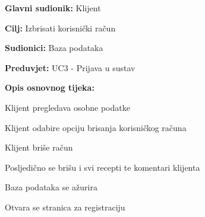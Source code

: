 					\noindent {}
					\begin{packed_item}
	
						\item \textbf{Glavni sudionik: } Klijent
						\item  \textbf{Cilj:} Izbrisati korisnički račun
						\item  \textbf{Sudionici:} Baza podataka
						\item  \textbf{Preduvjet:} UC3 - Prijava u sustav
						\item  \textbf{Opis osnovnog tijeka:}
						
						\item[] \begin{packed_enum}
	
							\item Klijent pregledava osobne podatke
							\item Klijent odabire opciju brisanja korisničkog računa
							\item Klijent briše račun
							\item Posljedično se brišu i svi recepti te komentari klijenta
							\item Baza podataka se ažurira
							\item Otvara se stranica za registraciju
						
						\end{packed_enum}
					\end{packed_item}

